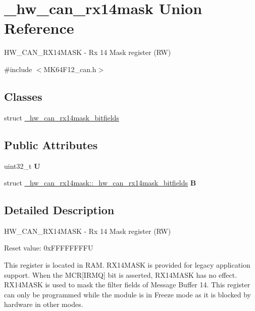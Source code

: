 \hypertarget{union__hw__can__rx14mask}{}\section{\+\_\+hw\+\_\+can\+\_\+rx14mask Union Reference}
\label{union__hw__can__rx14mask}


H\+W\+\_\+\+C\+A\+N\+\_\+\+R\+X14\+M\+A\+SK -\/ Rx 14 Mask register (RW)  




{\ttfamily \#include $<$M\+K64\+F12\+\_\+can.\+h$>$}

\subsection*{Classes}
\begin{DoxyCompactItemize}
\item 
struct \hyperlink{struct__hw__can__rx14mask_1_1__hw__can__rx14mask__bitfields}{\+\_\+hw\+\_\+can\+\_\+rx14mask\+\_\+bitfields}
\end{DoxyCompactItemize}
\subsection*{Public Attributes}
\begin{DoxyCompactItemize}
\item 
uint32\+\_\+t {\bfseries U}\hypertarget{union__hw__can__rx14mask_aaef5ea7762856901aa3aac2ca1aa0792}{}\label{union__hw__can__rx14mask_aaef5ea7762856901aa3aac2ca1aa0792}

\item 
struct \hyperlink{struct__hw__can__rx14mask_1_1__hw__can__rx14mask__bitfields}{\+\_\+hw\+\_\+can\+\_\+rx14mask\+::\+\_\+hw\+\_\+can\+\_\+rx14mask\+\_\+bitfields} {\bfseries B}\hypertarget{union__hw__can__rx14mask_a6df844e8efa4a665c6890434ec3f9f9a}{}\label{union__hw__can__rx14mask_a6df844e8efa4a665c6890434ec3f9f9a}

\end{DoxyCompactItemize}


\subsection{Detailed Description}
H\+W\+\_\+\+C\+A\+N\+\_\+\+R\+X14\+M\+A\+SK -\/ Rx 14 Mask register (RW) 

Reset value\+: 0x\+F\+F\+F\+F\+F\+F\+F\+FU

This register is located in R\+AM. R\+X14\+M\+A\+SK is provided for legacy application support. When the M\+CR\mbox{[}I\+R\+MQ\mbox{]} bit is asserted, R\+X14\+M\+A\+SK has no effect. R\+X14\+M\+A\+SK is used to mask the filter fields of Message Buffer 14. This register can only be programmed while the module is in Freeze mode as it is blocked by hardware in other modes. 


